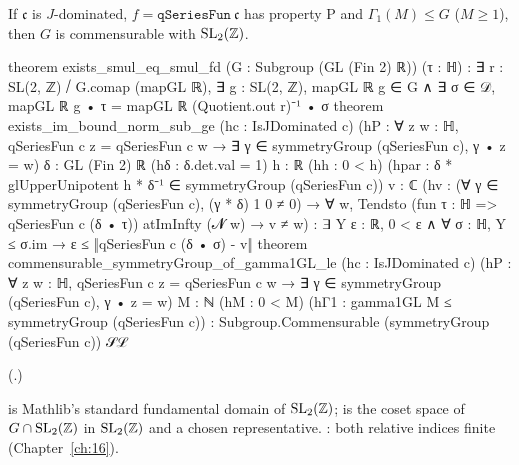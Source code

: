 \begin{theorem}[Commensurability]\label{ch19:thm:index}
If $\mathfrak c$ is $J$-dominated, $f=\mathtt{qSeriesFun}\ \mathfrak c$ has property P and $\Gamma_1(M)\le G$ ($M\ge1$), then $G$ is commensurable with $\mathrm{SL}_2(\mathbb{Z})$.
\end{theorem}
\begin{leancode}
theorem exists_smul_eq_smul_fd (G : Subgroup (GL (Fin 2) ℝ)) (τ : ℍ) :
    ∃ r : SL(2, ℤ) ⧸ G.comap (mapGL ℝ), ∃ g : SL(2, ℤ), mapGL ℝ g ∈ G ∧
      ∃ σ ∈ 𝒟, mapGL ℝ g • τ = mapGL ℝ (Quotient.out r)⁻¹ • σ
theorem exists_im_bound_norm_sub_ge (hc : IsJDominated c)
    (hP : ∀ z w : ℍ, qSeriesFun c z = qSeriesFun c w →
      ∃ γ ∈ symmetryGroup (qSeriesFun c), γ • z = w)
    {δ : GL (Fin 2) ℝ} (hδ : δ.det.val = 1) {h : ℝ} (hh : 0 < h)
    (hpar : δ * glUpperUnipotent h * δ⁻¹ ∈ symmetryGroup (qSeriesFun c)) {v : ℂ}
    (hv : (∀ γ ∈ symmetryGroup (qSeriesFun c), (γ * δ) 1 0 ≠ 0) →
      ∀ w, Tendsto (fun τ : ℍ => qSeriesFun c (δ • τ)) atImInfty (𝓝 w) → v ≠ w) :
    ∃ Y ε : ℝ, 0 < ε ∧ ∀ σ : ℍ, Y ≤ σ.im → ε ≤ ‖qSeriesFun c (δ • σ) - v‖
theorem commensurable_symmetryGroup_of_gamma1GL_le (hc : IsJDominated c)
    (hP : ∀ z w : ℍ, qSeriesFun c z = qSeriesFun c w →
      ∃ γ ∈ symmetryGroup (qSeriesFun c), γ • z = w)
    {M : ℕ} (hM : 0 < M) (hΓ1 : gamma1GL M ≤ symmetryGroup (qSeriesFun c)) :
    Subgroup.Commensurable (symmetryGroup (qSeriesFun c)) 𝒮ℒ
\end{leancode}
(.)
\begin{dictionary}
 is Mathlib's standard fundamental domain  of $\mathrm{SL}_2(\mathbb{Z})$;  is the coset space
of $G\cap\mathrm{SL}_2(\mathbb{Z})$ in $\mathrm{SL}_2(\mathbb{Z})$ and  a chosen representative.  : both relative indices
finite (Chapter~\ref{ch:16}).
\end{dictionary}
